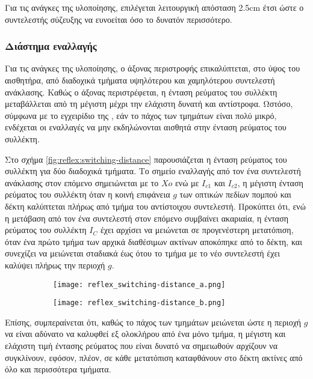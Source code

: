 Για τις ανάγκες της υλοποίησης, επιλέγεται λειτουργική απόσταση 2.5cm έτσι ώστε
ο συντελεστής σύζευξης να ευνοείται όσο το δυνατόν περισσότερο.


\subsubsection{Διάστημα εναλλαγής}

Για τις ανάγκες της υλοποίησης, ο άξονας περιστροφής επικαλύπτεται, στο ύψος του
αισθητήρα, από διαδοχικά τμήματα υψηλότερου και χαμηλότερου συντελεστή
ανάκλασης. Καθώς ο άξονας περιστρέφεται, η ένταση ρεύματος του συλλέκτη
μεταβάλλεται από τη μέγιστη μέχρι την ελάχιστη δυνατή και αντίστροφα.
Ωστόσο, σύμφωνα με το εγχειρίδιο της \textcite{vishay06}, εάν το πάχος των
τμημάτων είναι πολύ μικρό, ενδέχεται οι εναλλαγές να μην εκδηλώνονται αισθητά
στην ένταση ρεύματος του συλλέκτη.

Στο σχήμα \ref{fig:reflex:switching-distance} παρουσιάζεται η ένταση ρεύματος
του συλλέκτη για δύο διαδοχικά τμήματα.
Το σημείο εναλλαγής από τον ένα συντελεστή ανάκλασης στον επόμενο σημειώνεται
με το $Xo$ ενώ με $I_{c1}$ και $I_{c2}$, η μέγιστη ένταση ρεύματος του
συλλέκτη όταν η κοινή επιφάνεια $g$ των οπτικών πεδίων πομπού και δέκτη
καλύπτεται πλήρως από τμήμα του αντίστοιχου συντελεστή.
Προκύπτει ότι, ενώ η μετάβαση από τον ένα συντελεστή στον επόμενο συμβαίνει
ακαριαία, η ένταση ρεύματος του συλλέκτη $I_C$ έχει αρχίσει να μειώνεται σε
προγενέστερη μετατόπιση, όταν ένα πρώτο τμήμα των αρχικά διαθέσιμων ακτίνων
αποκόπηκε από το δέκτη, και συνεχίζει να μειώνεται σταδιακά έως ότου το τμήμα με
το νέο συντελεστή έχει καλύψει πλήρως την περιοχή $g$.

\begin{figure}
    \caption{Σχέση μεταβολής ρεύματος $I_C$ και συντελεστή ανάκλασης.
        \label{fig:reflex:switching-distance}}
    \begin{center}
        \begin{subfigure}{0.45\linewidth}
            \texttt{[image: reflex\_switching-distance\_a.png]}
        \end{subfigure}
        \begin{subfigure}{0.45\linewidth}
            \texttt{[image: reflex\_switching-distance\_b.png]}
        \end{subfigure}
    \end{center}
\end{figure}

Επίσης, συμπεραίνεται ότι, καθώς το πάχος των τμημάτων μειώνεται ώστε η περιοχή
$g$ να είναι αδύνατο να καλυφθεί εξ ολοκλήρου από ένα μόνο τμήμα, η μέγιστη και
ελάχιστη τιμή έντασης ρεύματος που είναι δυνατό να σημειωθούν αρχίζουν να
συγκλίνουν, εφόσον, πλέον, σε κάθε μετατόπιση καταφθάνουν στο δέκτη ακτίνες από
όλο και περισσότερα τμήματα.

